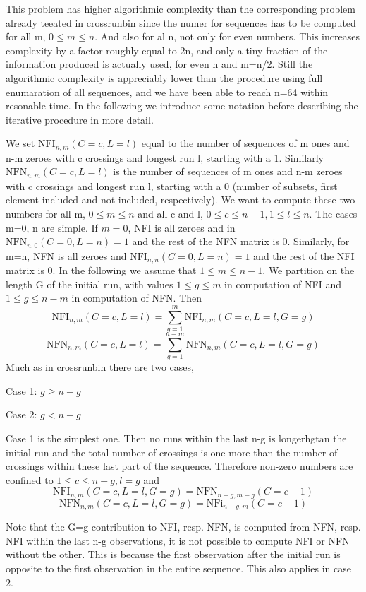 This problem has higher algorithmic complexity than the corresponding problem already teeated in crossrunbin since the numer for sequences has to be computed for all m, $0 \leq m \leq n$. And also for al n, not only for even numbers. This increases complexity by a factor roughly equal to 2n, and only a tiny fraction of the information produced is actually used, for even n and m=n/2. Still the algorithmic complexity is appreciably lower than the procedure using full enumaration of all sequences, and we have been able to reach n=64 within resonable time. In the following we introduce some notation before describing the iterative procedure in more detail.

We set $\text{NFI}_{n,m} (C=c, L=l)$ equal to the number of sequences of m ones and n-m zeroes with c crossings and longest run l, starting with a 1. Similarly $\text{NFN}_{n,m} (C=c, L=l)$ is the number of sequences of m ones and n-m zeroes with c crossings and longest run l, starting with a 0 (number of subsets, first element included and not included, respectively). We want to compute these two numbers for all m, $0 \leq m \leq n$ and all c and l, $0 \leq c \leq n-1, 1 \leq l \leq n$. The cases m=0, n are simple. If $m=0$, NFI is all zeroes and in $\text{NFN}_{n,0} (C=0, L=n)=1$ and the rest of the NFN matrix is 0. Similarly, for m=n, NFN is all zeroes and $\text{NFI}_{n,n} (C=0, L=n)=1$ and the rest of the NFI matrix is 0. In the following we assume that $1 \leq m \leq n-1$. We partition on the length G of the initial run, with values $1 \leq g \leq m$ in computation
of NFI and $1 \leq g \leq n-m$ in computation of NFN. Then $$\text{NFI}_{n,m} (C=c, L=l) = \sum_{g=1}^m \text{NFI}_{n,m} (C=c, L=l, G=g)$$
$$\text{NFN}_{n,m} (C=c, L=l) = \sum_{g=1}^{n-m} \text{NFN}_{n,m} (C=c, L=l, G=g)$$
Much as in crossrunbin there are two cases, 

Case 1: $g \geq n-g$

Case 2: $g < n-g$

Case 1 is the simplest one. Then no runs within the last n-g is longerhgtan the initial run and the total number of crossings is one more than the number of crossings within these last part of the sequence. Therefore non-zero numbers are confined to $1 \leq c \leq n-g, l=g$ and $$\text{NFI}_{n,m} (C=c, L=l, G=g) = \text{NFN}_{n-g,m-g} (C=c-1)$$
$$\text{NFN}_{n,m} (C=c, L=l, G=g) = \text{NFi}_{n-g,m} (C=c-1)$$

Note that the G=g contribution to NFI, resp. NFN, is computed from NFN, resp. NFI within the last n-g observations, it is not possible to compute NFI or NFN without the other. This is because the first observation after the initial run is opposite to the first observation in the entire sequence. This also applies in case 2.

